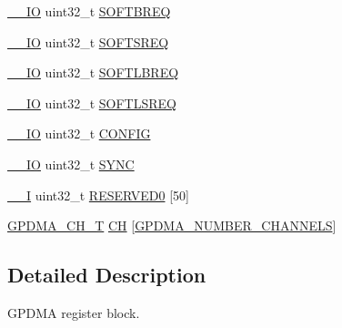 \begin{DoxyCompactItemize}
\item 
\hyperlink{core__cm3_8h_aec43007d9998a0a0e01faede4133d6be}{\-\_\-\-\_\-\-I\-O} uint32\-\_\-t \hyperlink{structLPC__GPDMA__T_ac6bbc437741b88b7178437840f482bd7}{S\-O\-F\-T\-B\-R\-E\-Q}
\item 
\hyperlink{core__cm3_8h_aec43007d9998a0a0e01faede4133d6be}{\-\_\-\-\_\-\-I\-O} uint32\-\_\-t \hyperlink{structLPC__GPDMA__T_a2905a8988cfd38c6e44d121783c0bfe7}{S\-O\-F\-T\-S\-R\-E\-Q}
\item 
\hyperlink{core__cm3_8h_aec43007d9998a0a0e01faede4133d6be}{\-\_\-\-\_\-\-I\-O} uint32\-\_\-t \hyperlink{structLPC__GPDMA__T_a565d4d2985feee1cf21acee1185373a5}{S\-O\-F\-T\-L\-B\-R\-E\-Q}
\item 
\hyperlink{core__cm3_8h_aec43007d9998a0a0e01faede4133d6be}{\-\_\-\-\_\-\-I\-O} uint32\-\_\-t \hyperlink{structLPC__GPDMA__T_a0b7a85e9f40e19d368c8358ca48778de}{S\-O\-F\-T\-L\-S\-R\-E\-Q}
\item 
\hyperlink{core__cm3_8h_aec43007d9998a0a0e01faede4133d6be}{\-\_\-\-\_\-\-I\-O} uint32\-\_\-t \hyperlink{structLPC__GPDMA__T_a059b4997225adef9a773dca681a4b676}{C\-O\-N\-F\-I\-G}
\item 
\hyperlink{core__cm3_8h_aec43007d9998a0a0e01faede4133d6be}{\-\_\-\-\_\-\-I\-O} uint32\-\_\-t \hyperlink{structLPC__GPDMA__T_ac89c20888b14781ead9fe459f8f79853}{S\-Y\-N\-C}
\item 
\hyperlink{core__cm3_8h_af63697ed9952cc71e1225efe205f6cd3}{\-\_\-\-\_\-\-I} uint32\-\_\-t \hyperlink{structLPC__GPDMA__T_aa500686787db277559756be8d486c0c2}{R\-E\-S\-E\-R\-V\-E\-D0} \mbox{[}50\mbox{]}
\item 
\hyperlink{structGPDMA__CH__T}{G\-P\-D\-M\-A\-\_\-\-C\-H\-\_\-\-T} \hyperlink{structLPC__GPDMA__T_ab6b2ec077df490e64b10e7cb2bfeee10}{C\-H} \mbox{[}\hyperlink{group__GPDMA__17XX__40XX_gaf7c43b3d13c91c30ddf67e479966d5cd}{G\-P\-D\-M\-A\-\_\-\-N\-U\-M\-B\-E\-R\-\_\-\-C\-H\-A\-N\-N\-E\-L\-S}\mbox{]}
\end{DoxyCompactItemize}


\subsection{Detailed Description}
G\-P\-D\-M\-A register block. 

